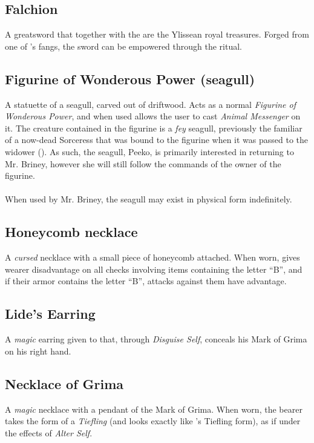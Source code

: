\subsection{Falchion}
\label{items:falchion}
A greatsword that together with the  are the Ylissean royal treasures. Forged from one of  's fangs, the sword can be empowered through the  ritual.

\subsection{Figurine of Wonderous Power (seagull)}
\label{items:peeko}
A statuette of a seagull, carved out of driftwood. Acts as a normal \textit{Figurine of Wonderous Power}, and when used allows the user to cast \textit{Animal Messenger} on it. The creature contained in the figurine is a \textit{fey} seagull, previously the familiar of a now-dead Sorceress that was bound to the figurine when it was passed to the widower (). As such, the seagull, Peeko, is primarily interested in returning to Mr. Briney, however she will still follow the commands of the owner of the figurine.\\
\\
When used by Mr. Briney, the seagull may exist in physical form indefinitely.

\subsection{Honeycomb necklace}
\label{items:honeycomb}
A \textit{cursed} necklace with a small piece of honeycomb attached. When worn, gives wearer disadvantage on all checks involving items containing the letter ``B'', and if their armor contains the letter ``B'', attacks against them have advantage. 


\subsection{Lide's Earring}
\label{items:lideearring}
A \textit{magic} earring given to  that, through \textit{Disguise Self}, conceals his Mark of Grima on his right hand.

\subsection{Necklace of Grima}
\label{items:grimanecklace}
A \textit{magic} necklace with a pendant of the Mark of Grima. When worn, the bearer takes the form of a \textit{Tiefling} (and looks exactly like 's Tiefling form), as if under the effects of \textit{Alter Self}.


